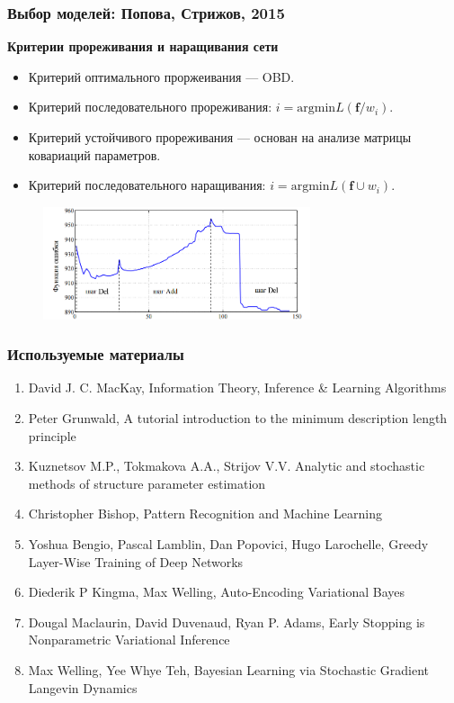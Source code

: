 \documentclass[10pt,pdf,utf8,russian,aspectratio=169]{beamer}
\begin{document}
\begin{frame}
\frametitle{Выбор моделей: Попова,  Стрижов, 2015}
\textbf{Критерии прореживания и наращивания сети}
\begin{itemize}
\item Критерий оптимального проржеивания --- OBD.
\item Критерий последовательного прореживания:  $i = \text{argmin} L(\mathbf{f}/{w}_i)$.
\item Критерий устойчивого прореживания --- основан на анализе матрицы ковариаций параметров.
\item Критерий последовательного наращивания:  $i = \text{argmin} L(\mathbf{f} \cup {w}_i)$.
\end{itemize}
\begin{figure}
\centering
\includegraphics[width=0.7\textwidth]{adddel.png}
\end{figure}
\end{frame}


\begin{frame}
\frametitle{Используемые материалы}
\begin{enumerate}
\item David J. C. MacKay, Information Theory, Inference \& Learning Algorithms
\item Peter Grunwald, A tutorial introduction to the minimum description length principle
\item Kuznetsov M.P., Tokmakova A.A., Strijov V.V. Analytic and stochastic methods of structure parameter estimation
\item Christopher Bishop, Pattern Recognition and Machine Learning
\item Yoshua Bengio, Pascal Lamblin, Dan Popovici, Hugo Larochelle, Greedy Layer-Wise Training of Deep Networks
\item Diederik P Kingma, Max Welling, Auto-Encoding Variational Bayes
\item Dougal Maclaurin, David Duvenaud, Ryan P. Adams, Early Stopping is Nonparametric Variational Inference
\item Max Welling, Yee Whye Teh, Bayesian Learning via Stochastic Gradient Langevin Dynamics
\end{enumerate}
\end{frame}
\end{document}
